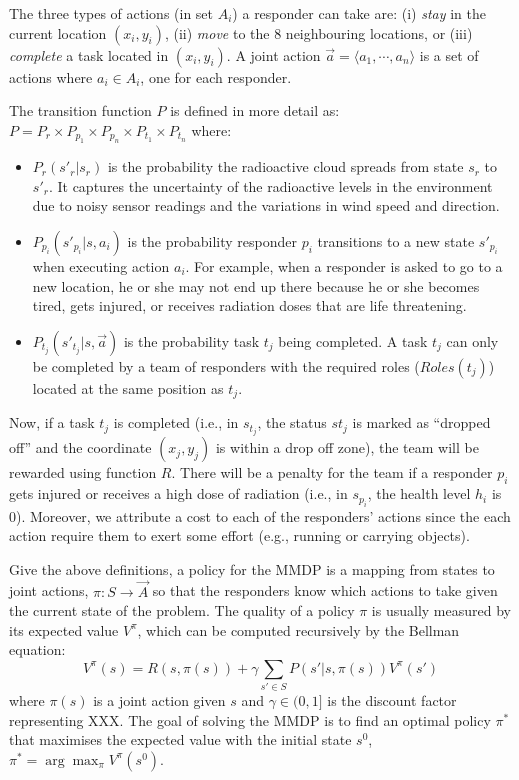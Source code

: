 The three types of actions  (in set $A_i$) a responder can take
are: (i) {\em stay} in the current location $(x_i, y_i)$, (ii) {\em
move} to the 8 neighbouring locations, or (iii) {\em complete} a
task located in $(x_i, y_i)$. A joint action $\vec{a}=\langle a_1,
\cdots, a_n \rangle$ is a set of actions where $a_i\in A_i$, one
for each responder. 

The transition function $P$ is defined in more detail as: $P= P_r
\times P_{p_1} \times P_{p_n} \times P_{t_1} \times P_{t_n}$ where:
\begin{itemize}
    \itemsep=-2pt
    \item $P_r(s'_r|s_r)$ is the probability the
        radioactive cloud spreads from state $s_r$ to $s'_r$.
        It captures the uncertainty of the  radioactive
        levels in the environment due to  noisy sensor
        readings and the variations in wind speed and direction.
    \item $P_{p_i}(s'_{p_i}|s, a_i)$ is the probability 
        responder $p_i$ transitions to a new state $s'_{p_i}$
        when executing action $a_i$. For example, when a
        responder is asked to go to a new location, he or she
        may not end up there because he or she becomes tired, gets
        injured, or receives radiation doses that are life
        threatening.
    \item $P_{t_j}(s'_{t_j}|s, \vec{a})$ is the probability 
        task $t_j$ being completed. A task $t_j$ can only be completed by a
        team of responders with the required roles ($Roles(t_j)$) located at the
        same position as $t_j$.
\end{itemize}

Now,  if a task $t_j$ is completed (i.e., in $s_{t_j}$, the status
$st_j$ is marked as ``dropped off'' and the coordinate $(x_j, y_j)$
is within a drop off zone), the team will be rewarded using
function $R$. There will be a penalty for the team if a responder
$p_i$ gets injured or receives a high dose of radiation (i.e., in
$s_{p_i}$, the health level $h_i$ is 0). Moreover, we attribute a
cost to each of the responders' actions since the each  action require them to
exert some effort (e.g., running or carrying objects).


Give the above definitions, a policy for the MMDP is a mapping from
states to joint actions, $\pi: S \rightarrow \vec{A}$ so that the
responders know which actions to take given the current state of
the problem. The quality of a policy $\pi$ is usually measured by
its expected value $V^\pi$, which can be computed recursively by
the Bellman equation:
\begin{equation}
  V^\pi(s) = R(s, \pi(s)) + \gamma\sum_{s'\in S} P(s'|s, \pi(s)) V^\pi(s')
\end{equation}
where $\pi(s)$ is a joint action given $s$ and $\gamma\in(0, 1]$ is
the discount factor representing XXX. The goal of solving the MMDP is to find an
optimal policy $\pi^*$ that maximises the expected value with the
initial state $s^0$, $\pi^* = \arg\max_{\pi} V^\pi(s^0)$.

